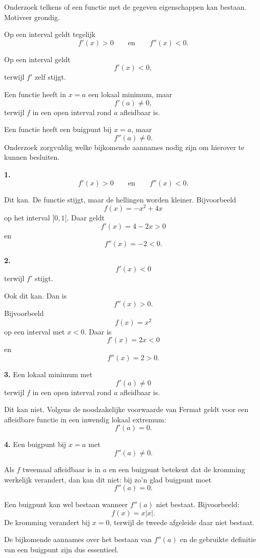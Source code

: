 \documentclass{ximera}
\begin{document}
\begin{oefening}{\oefG}

Onderzoek telkens of een functie met de gegeven eigenschappen
kan bestaan. Motiveer grondig.

\begin{question}
Op een interval geldt tegelijk
\[
f'(x)>0
\qquad\text{en}\qquad
f''(x)<0.
\]
\end{question}

\begin{question}
Op een interval geldt
\[
f'(x)<0,
\]
terwijl $f'$ zelf stijgt.
\end{question}

\begin{question}
Een functie heeft in $x=a$ een lokaal minimum, maar
\[
f'(a)\neq 0,
\]
terwijl $f$ in een open interval rond $a$ afleidbaar is.
\end{question}

\begin{question}
Een functie heeft een buigpunt bij $x=a$, maar
\[
f''(a)\neq0.
\]
Onderzoek zorgvuldig welke bijkomende aannames nodig zijn om
hierover te kunnen besluiten.
\end{question}

\begin{oplossing}

\textbf{1.}
\[
f'(x)>0
\qquad\text{en}\qquad
f''(x)<0.
\]

Dit kan. De functie stijgt, maar de hellingen worden kleiner. Bijvoorbeeld
\[
f(x)=-x^2+4x
\]
op het interval $]0,1[$. Daar geldt
\[
f'(x)=4-2x>0
\]
en
\[
f''(x)=-2<0.
\]

\medskip

\textbf{2.}
\[
f'(x)<0
\]
terwijl $f'$ stijgt.

Ook dit kan. Dan is
\[
f''(x)>0.
\]
Bijvoorbeeld
\[
f(x)=x^2
\]
op een interval met $x<0$. Daar is
\[
f'(x)=2x<0
\]
en
\[
f''(x)=2>0.
\]

\medskip

\textbf{3.} Een lokaal minimum met
\[
f'(a)\neq0
\]
terwijl $f$ in een open interval rond $a$ afleidbaar is.

Dit kan niet. Volgens de noodzakelijke voorwaarde van Fermat geldt voor een
afleidbare functie in een inwendig lokaal extremum:
\[
f'(a)=0.
\]

\medskip

\textbf{4.} Een buigpunt bij $x=a$ met
\[
f''(a)\neq0.
\]

Als $f$ tweemaal afleidbaar is in $a$ en een buigpunt betekent dat de
kromming werkelijk verandert, dan kan dit niet: bij zo'n glad buigpunt moet
\[
f''(a)=0.
\]

Een buigpunt kan wel bestaan wanneer $f''(a)$ niet bestaat. Bijvoorbeeld:
\[
f(x)=x|x|.
\]
De kromming verandert bij $x=0$, terwijl de tweede afgeleide daar niet
bestaat.

De bijkomende aannames over het bestaan van $f''(a)$ en de gebruikte
definitie van een buigpunt zijn dus essentieel.

\end{oplossing}

\end{oefening}
\end{document}

